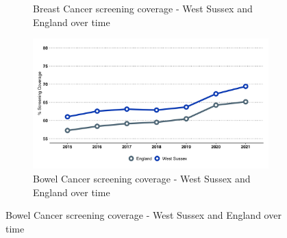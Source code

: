 \begin{figure}
\begin{subfigure}[b]{0.32\textwidth}
        \caption{Breast Cancer screening coverage - West Sussex and England over time}
        \label{fig:breast:time}
    \end{subfigure}
    \begin{subfigure}[b]{0.32\textwidth}
        \centering
        \includegraphics[width=\textwidth]{images/bowel_cancer_screening.png}
        \caption{Bowel Cancer screening coverage - West Sussex and England over time}
        \label{fig:bowel:time}
    \end{subfigure}
\end{figure}






